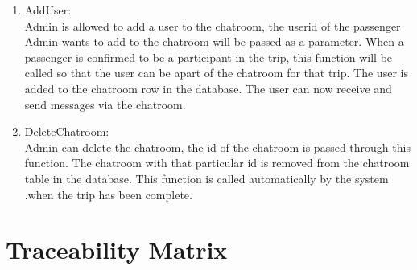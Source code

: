 \documentclass[hidelinks, 12pt, a4paper]{article}
\begin{document}
\begin{enumerate}[label=U1.\arabic*]
                \item AddUser:\\
                Admin is allowed to add a user to the chatroom, the userid of the passenger Admin wants to add to the chatroom will be passed as a parameter. When a passenger is confirmed to be a participant in the trip, this function will be called so that the user can be apart of the chatroom for that trip. The user is added to the chatroom row in the database. The user can now receive and send messages via the chatroom.\\

                \item DeleteChatroom:\\
                Admin can delete the chatroom, the id of the chatroom is passed through this function. The chatroom with that particular id is removed from the chatroom table in the database. This function is called automatically by the system .when the trip has been complete.\\
    \end{enumerate}
    \newpage
    \section{Traceability Matrix}
\end{document}
